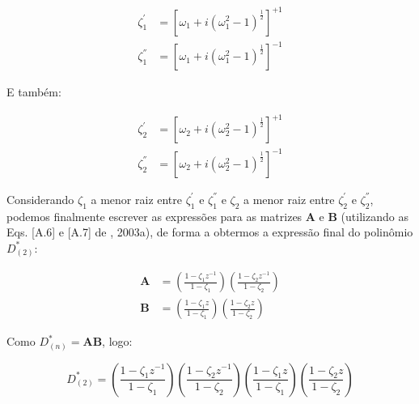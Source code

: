 \begin{align}
\label{apV_eq:31}
\zeta_{1}^{'} & = \left[ \omega_{1} + i (\omega_{1}^{2} - 1)^\frac{1}{2} \right]^{+1} \\
\label{apV_eq:32}
\zeta_{1}^{''} & = \left[ \omega_{1} + i (\omega_{1}^{2} - 1)^\frac{1}{2} \right]^{-1}
\end{align}

E também:



\begin{align}
\label{apV_eq:33}
\zeta_{2}^{'} & = \left[ \omega_{2} + i (\omega_{2}^{2} - 1)^\frac{1}{2} \right]^{+1} \\
\label{apV_eq:34}
\zeta_{2}^{''} & = \left[ \omega_{2} + i (\omega_{2}^{2} - 1)^\frac{1}{2} \right]^{-1}
\end{align}

Considerando $\zeta_{1}$ a menor raiz entre $\zeta^{'}_{1}$ e $\zeta^{''}_{1}$ e $\zeta_{2}$ a menor raiz entre $\zeta^{'}_{2}$ e $\zeta^{''}_{2}$, podemos finalmente escrever as expressões para as matrizes $\mathbf{A}$ e $\mathbf{B}$ (utilizando as Eqs. [A.6] e [A.7] de , 2003a), de forma a obtermos a expressão final do polinômio $D^{*}_{(2)}$:



\begin{align}
\label{apV_eq:35}
\mathbf{A} & = \left( \frac{1 - \zeta_{1}z^{-1}}{1 - \zeta_{1}} \right)\left( \frac{1 - \zeta_{2}z^{-1}}{1 - \zeta_{2}} \right) \\
\label{apV_eq:36}
\mathbf{B} & = \left( \frac{1 - \zeta_{1}z}{1 - \zeta_{1}} \right)\left( \frac{1 - \zeta_{2}z}{1 - \zeta_{2}} \right)
\end{align}

Como $D^{*}_{(n)} = \mathbf{AB}$, logo:

\begin{equation}
\label{apV_eq:37}
D^{*}_{(2)} = \left( \frac{1 - \zeta_{1}z^{-1}}{1 - \zeta_{1}} \right)\left( \frac{1 - \zeta_{2}z^{-1}}{1 - \zeta_{2}} \right)\left( \frac{1 - \zeta_{1}z}{1 - \zeta_{1}} \right)\left( \frac{1 - \zeta_{2}z}{1 - \zeta_{2}} \right)
\end{equation}
